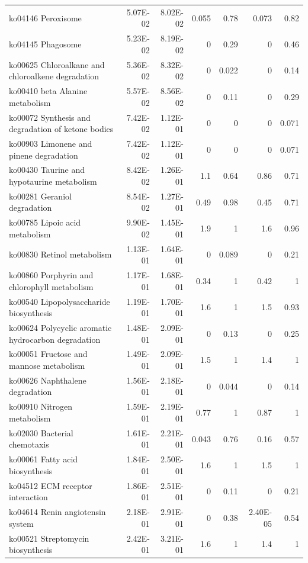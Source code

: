 {\begin{longtable}{ | l | r | r | r | r | r | r  | }
		ko04146 Peroxisome & 5.07E-02 & 8.02E-02 & 0.055 & 0.78 & 0.073 & 0.82 \\ 
		ko04145 Phagosome & 5.23E-02 & 8.19E-02 & 0 & 0.29 & 0 & 0.46 \\ 
		ko00625 Chloroalkane and chloroalkene degradation & 5.36E-02 & 8.32E-02 & 0 & 0.022 & 0 & 0.14 \\ 
		ko00410 beta Alanine metabolism & 5.57E-02 & 8.56E-02 & 0 & 0.11 & 0 & 0.29 \\ 
		ko00072 Synthesis and degradation of ketone bodies & 7.42E-02 & 1.12E-01 & 0 & 0 & 0 & 0.071 \\ 
		ko00903 Limonene and pinene degradation & 7.42E-02 & 1.12E-01 & 0 & 0 & 0 & 0.071 \\ 
		ko00430 Taurine and hypotaurine metabolism & 8.42E-02 & 1.26E-01 & 1.1 & 0.64 & 0.86 & 0.71 \\ 
		ko00281 Geraniol degradation & 8.54E-02 & 1.27E-01 & 0.49 & 0.98 & 0.45 & 0.71 \\ 
		ko00785 Lipoic acid metabolism & 9.90E-02 & 1.45E-01 & 1.9 & 1 & 1.6 & 0.96 \\ 
		ko00830 Retinol metabolism & 1.13E-01 & 1.64E-01 & 0 & 0.089 & 0 & 0.21 \\ 
		ko00860 Porphyrin and chlorophyll metabolism & 1.17E-01 & 1.68E-01 & 0.34 & 1 & 0.42 & 1 \\ 
		ko00540 Lipopolysaccharide biosynthesis & 1.19E-01 & 1.70E-01 & 1.6 & 1 & 1.5 & 0.93 \\ 
		ko00624 Polycyclic aromatic hydrocarbon degradation & 1.48E-01 & 2.09E-01 & 0 & 0.13 & 0 & 0.25 \\ 
		ko00051 Fructose and mannose metabolism & 1.49E-01 & 2.09E-01 & 1.5 & 1 & 1.4 & 1 \\ 
		ko00626 Naphthalene degradation & 1.56E-01 & 2.18E-01 & 0 & 0.044 & 0 & 0.14 \\ 
		ko00910 Nitrogen metabolism & 1.59E-01 & 2.19E-01 & 0.77 & 1 & 0.87 & 1 \\ 
		ko02030 Bacterial chemotaxis & 1.61E-01 & 2.21E-01 & 0.043 & 0.76 & 0.16 & 0.57 \\ 
		ko00061 Fatty acid biosynthesis & 1.84E-01 & 2.50E-01 & 1.6 & 1 & 1.5 & 1 \\ 
		ko04512 ECM receptor interaction & 1.86E-01 & 2.51E-01 & 0 & 0.11 & 0 & 0.21 \\ 
		ko04614 Renin angiotensin system & 2.18E-01 & 2.91E-01 & 0 & 0.38 & 2.40E-05 & 0.54 \\ 
		ko00521 Streptomycin biosynthesis & 2.42E-01 & 3.21E-01 & 1.6 & 1 & 1.4 & 1 \\ 

\end{longtable}}
